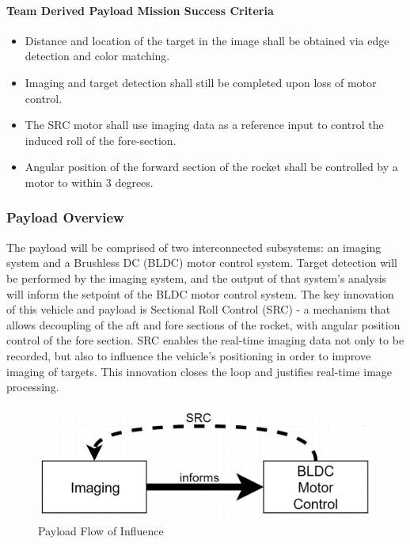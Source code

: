 \documentclass[class=article, crop=false]{standalone}
\begin{document}
	\paragraph{Team Derived Payload Mission Success Criteria} 
	\begin{itemize}
		\item Distance and location of the target in the image shall be obtained via edge detection and color matching.
		\item Imaging and target detection shall still be completed upon loss of motor control.
		\item The SRC motor shall use imaging data as a reference input to control the induced roll of the fore-section.
		\item Angular position of the forward section of the rocket shall be controlled by a motor to within 3 degrees.						
	\end{itemize}

	\pagebreak
	
	\subsubsection{Payload Overview}
	The payload will be comprised of two interconnected subsystems: an imaging system and a Brushless DC (BLDC) motor control system. Target detection will be performed by the imaging system, and the output of that system's analysis will inform the setpoint of the BLDC motor control system. The key innovation of this vehicle and payload is Sectional Roll Control (SRC) - a mechanism that allows decoupling of the aft and fore sections of the rocket, with angular position control of the fore section. SRC enables the real-time imaging data not only to be recorded, but also to influence the vehicle's positioning in order to improve imaging of targets. This innovation closes the loop and justifies real-time image processing.
	
	\bigbreak
	
	\FloatBarrier
	\begin{figure}[!h]
		\centering
		\includegraphics[width=.7\linewidth]{09_Figures/Payload-Summary-Block-Diagram.png}
		\caption{Payload Flow of Influence}
		\label{fig:Payload-Summary-Block-Diagram}
	\end{figure}
	\FloatBarrier
	
\end{document}
